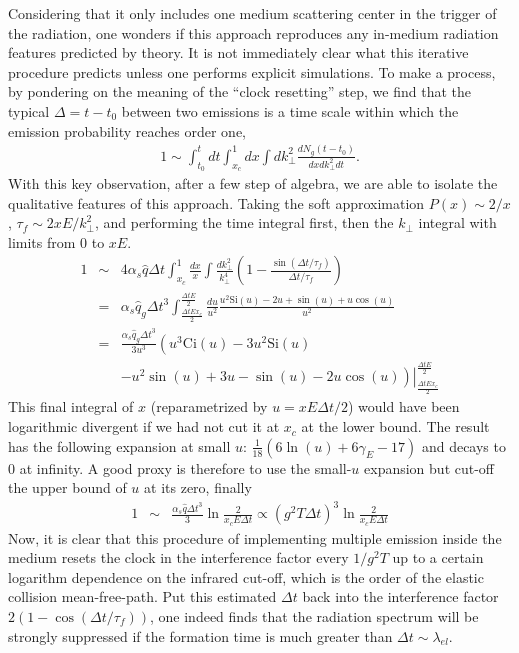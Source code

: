 Considering that it only includes one medium scattering center in the trigger of the radiation, one wonders if this approach reproduces any in-medium radiation features predicted by theory.
It is not immediately clear what this iterative procedure predicts unless one performs explicit simulations. 
To make a process, by pondering on the meaning of the ``clock resetting'' step, we find that the typical $\Delta = t-t_0$ between two emissions is a time scale within which the emission probability reaches order one,
\begin{eqnarray}
1 \sim \int_{t_0}^{t} dt\int_{x_c}^1 dx \int dk_\perp^2 \frac{dN_g(t-t_0)}{dx dk_\perp^2 dt}.
\end{eqnarray}
With this key observation, after a few step of algebra, we are able to isolate the qualitative features of this approach.
Taking the soft approximation $P(x) \sim 2/x$, $\tau_f\sim 2xE/k_\perp^2$, and performing the time integral first, then the $k_\perp$ integral with limits from $0$ to $xE$.
\begin{eqnarray}
1 &\sim& 4\alpha_s\hat{q}\Delta t \int_{x_c}^1 \frac{dx}{x} \int \frac{dk_\perp^2}{k_\perp^4}\left(1-\frac{\sin(\Delta t/\tau_f)}{\Delta t/\tau_f}\right)\\
&=& \alpha_s\hat{q}_g \Delta t^3 \int_{\frac{\Delta t E x_c}{2}}^{\frac{\Delta t E}{2}} 
\frac{du}{u^2} \frac{u^2 \mathrm{Si}(u) -2u + \sin(u) + u\cos(u)}{u^2}\\
&=& \frac{\alpha_s\hat{q}_g \Delta t^3}{3u^3} \left(
u^3\mathrm{Ci}(u)-3u^2\mathrm{Si}(u) \right.\\\nonumber
&&\left.\left.- u^2 \sin(u) +3u-\sin(u) - 2u\cos(u)\right)\right|_{\frac{\Delta t E x_c}{2}}^{\frac{\Delta t E}{2}} 
\end{eqnarray}
This final integral of $x$ (reparametrized by $u = xE\Delta t/2$) would have been logarithmic divergent if we had not cut it at $x_c$ at the lower bound.
The result has the following expansion at small $u$: $\frac{1}{18}(6\ln(u)+6\gamma_E - 17)$ and decays to $0$ at infinity. 
A good proxy is therefore to use the small-$u$ expansion but cut-off the upper bound of $u$ at its zero, finally
\begin{eqnarray}
1 &\sim&  \frac{\alpha_s\hat{q}\Delta t^3}{3}\ln\frac{2}{ x_c E \Delta t } \propto (g^2 T \Delta t)^3 \ln\frac{2}{ x_c E \Delta t }
\end{eqnarray}
Now, it is clear that this procedure of implementing multiple emission inside the medium resets the clock in the interference factor every $1/g^2T$ up to a certain logarithm dependence on the infrared cut-off, which is the order of the elastic collision mean-free-path.
Put this estimated $\Delta t$ back into the interference factor $2(1-\cos(\Delta t/\tau_f))$, one indeed finds that the radiation spectrum will be strongly suppressed if the formation time is much greater than $\Delta t\sim \lambda_{el}$.

